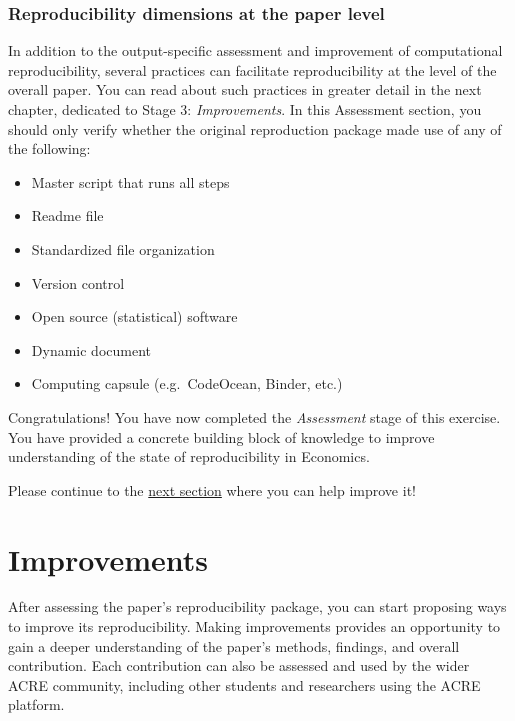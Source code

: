 \documentclass[]{book}
\providecommand{\tightlist}{%
  \setlength{\itemsep}{0pt}\setlength{\parskip}{0pt}}
\begin{document}
\hypertarget{reproducibility-dimensions-at-the-paper-level}{%
\subsection{Reproducibility dimensions at the paper level}\label{reproducibility-dimensions-at-the-paper-level}}

In addition to the output-specific assessment and improvement of computational reproducibility, several practices can facilitate reproducibility at the level of the overall paper. You can read about such practices in greater detail in the next chapter, dedicated to Stage 3: \emph{Improvements}. In this Assessment section, you should only verify whether the original reproduction package made use of any of the following:

\begin{itemize}
\tightlist
\item
  Master script that runs all steps
\item
  Readme file
\item
  Standardized file organization\\
\item
  Version control
\item
  Open source (statistical) software\\
\item
  Dynamic document\\
\item
  Computing capsule (e.g.~CodeOcean, Binder, etc.)
\end{itemize}

Congratulations! You have now completed the \emph{Assessment} stage of this exercise. You have provided a concrete building block of knowledge to improve understanding of the state of reproducibility in Economics.

Please continue to the \protect\hyperlink{improvements}{next section} where you can help improve it!

\hypertarget{improvements}{%
\chapter{Improvements}\label{improvements}}

After assessing the paper's reproducibility package, you can start proposing ways to improve its reproducibility. Making improvements provides an opportunity to gain a deeper understanding of the paper's methods, findings, and overall contribution. Each contribution can also be assessed and used by the wider ACRE community, including other students and researchers using the ACRE platform.
\end{document}
